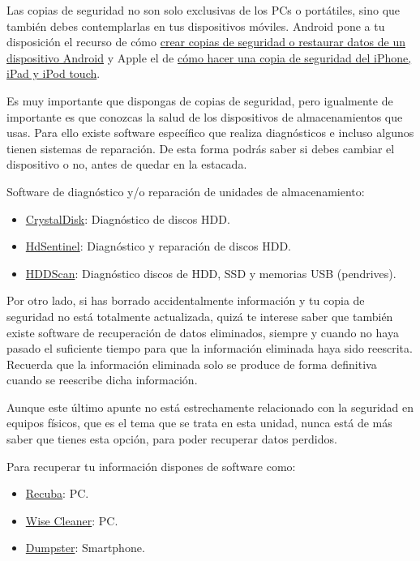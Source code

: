 \documentclass[
  spanish,
  a4paper,
  openany]{book}
\begin{document}
Las copias de seguridad no son solo exclusivas de los PCs o portátiles, sino que también debes contemplarlas en tus dispositivos móviles. Android pone a tu disposición el recurso de cómo \href{https://support.google.com/android/answer/2819582?hl=es&visit_id=637514255756661953-3969236140&rd=1}{crear copias de seguridad o restaurar datos de un dispositivo Android} y Apple el de \href{https://support.apple.com/es-es/HT203977}{cómo hacer una copia de seguridad del iPhone, iPad y iPod touch}.

Es muy importante que dispongas de copias de seguridad, pero igualmente de importante es que conozcas la salud de los dispositivos de almacenamientos que usas. Para ello existe software específico que realiza diagnósticos e incluso algunos tienen sistemas de reparación. De esta forma podrás saber si debes cambiar el dispositivo o no, antes de quedar en la estacada.

Software de diagnóstico y/o reparación de unidades de almacenamiento:

\begin{itemize}
\item
  \href{https://crystalmark.info/en/software/crystaldiskinfo/}{CrystalDisk}: Diagnóstico de discos HDD.
\item
  \href{https://www.hdsentinel.com/}{HdSentinel}: Diagnóstico y reparación de discos HDD.
\item
  \href{https://hddscan.com/}{HDDScan}: Diagnóstico discos de HDD, SSD y memorias USB (pendrives).
\end{itemize}

Por otro lado, si has borrado accidentalmente información y tu copia de seguridad no está totalmente actualizada, quizá te interese saber que también existe software de recuperación de datos eliminados, siempre y cuando no haya pasado el suficiente tiempo para que la información eliminada haya sido reescrita. Recuerda que la información eliminada solo se produce de forma definitiva cuando se reescribe dicha información.

Aunque este último apunte no está estrechamente relacionado con la seguridad en equipos físicos, que es el tema que se trata en esta unidad, nunca está de más saber que tienes esta opción, para poder recuperar datos perdidos.

Para recuperar tu información dispones de software como:

\begin{itemize}
\item
  \href{https://www.ccleaner.com/recuva}{Recuba}: PC.
\item
  \href{https://www.wisecleaner.com/wise-data-recovery.html}{Wise Cleaner}: PC.
\item
  \href{https://play.google.com/store/apps/details?id=com.baloota.dumpster&hl=es}{Dumpster}: Smartphone.
\end{itemize}
\end{document}
